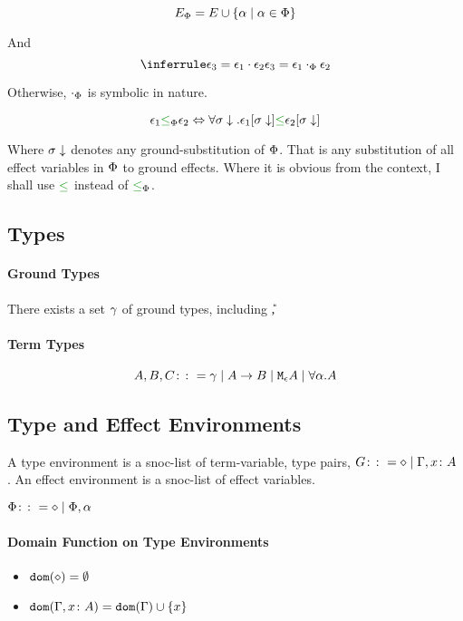 \documentclass{report}
\begin{document}
\begin{equation}
    E_\P = E \cup \left\{\a \mid \a \in \P \right\}
\end{equation}

And 
\begin{equation}
    \treeruleI{\e_3 = \e_1\dot\e_2}{\e_3 = \e_1\dotp\e_2}
\end{equation}

Otherwise, $\dotp$ is symbolic in nature.

\begin{equation}
    \e_1 \subeffectp \e_2 \Leftrightarrow \forall \si\downarrow. \e_1\sub{\si\downarrow} \subeffect \e_2\sub{\si\downarrow}
\end{equation}

Where $\si\downarrow$ denotes any ground-substitution of $\P$. That is any substitution of all effect variables in $\P$ to ground effects. Where it is obvious from the context, I shall use $\subeffect$ instead of $\subeffectp$.


\subsection{Types}
    \paragraph{Ground Types}
        There exists a set $\ground$ of ground types, including \U, \B
    \paragraph{Term Types}
    $$ A, B, C \gens \ground \mid \ab \mid \mea \mid \all{\a}{A}$$
  
\subsection{Type and Effect Environments}
A type environment is a snoc-list of term-variable, type pairs, $G \gens \nil \mid \gax$ .
An effect environment is a snoc-list of effect variables.

$\P\gens\nil\mid\P, \a$
\paragraph{Domain Function on Type Environments}
\begin{itemize}
    \item $\dom{\nil} = \emptyset$
    \item $\dom{\gax} =  \dom{\G}  \cup \left\{x \right\}$
\end{itemize}
\end{document}
